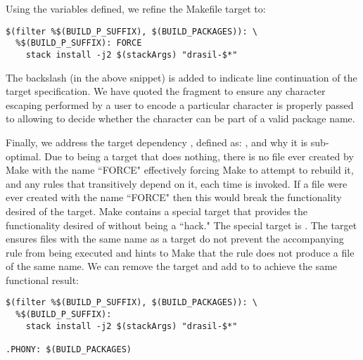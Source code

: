 {{Using the variables defined, we refine the Makefile target to:

\begin{tcolorbox}
\begin{verbatim}
$(filter %$(BUILD_P_SUFFIX), $(BUILD_PACKAGES)): \ 
  %$(BUILD_P_SUFFIX): FORCE
	stack install -j2 $(stackArgs) "drasil-$*"
\end{verbatim}
\end{tcolorbox}

The backslash (in the above snippet) is added to indicate line continuation of the target specification. We have quoted the  fragment to ensure any character escaping performed by a user to encode a particular character is properly passed to  allowing  to decide whether the character can be part of a valid package name. 

Finally, we address the target dependency , defined as: , and why it is sub-optimal. Due to  being a target that does nothing, there is no file ever created by Make with the name ``FORCE" effectively forcing Make to attempt to rebuild it, and any rules that transitively depend on it, each time  is invoked. If a file were ever created with the name ``FORCE" then this would break the functionality desired of the  target. Make contains a special target that provides the functionality desired of  without being a ``hack." The special target is . The  target ensures files with the same name as a target do not prevent the accompanying rule from being executed and hints to Make that the rule does not produce a file of the same name. We can remove the  target and add  to  to achieve the same functional result:

\begin{tcolorbox}
\begin{verbatim}
$(filter %$(BUILD_P_SUFFIX), $(BUILD_PACKAGES)): \ 
  %$(BUILD_P_SUFFIX):
	stack install -j2 $(stackArgs) "drasil-$*"

.PHONY: $(BUILD_PACKAGES)
\end{verbatim}
\end{tcolorbox}

}}
